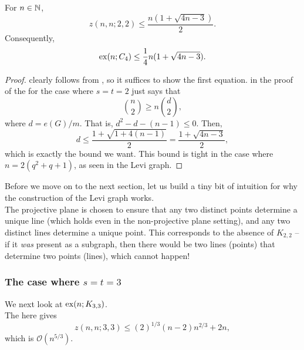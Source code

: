 \documentclass{article}
\begin{document}
		\begin{corollary}
			\label{theo: levi graph optimality}
			For $n\in\mathbb{N}$,
			\begin{equation}
				\label{eqn: z n n 2 2}
				z(n,n;2,2) \le \frac{n (1 + \sqrt{4n-3})}{2}.
			\end{equation}
			Consequently,
			\begin{equation}
				\label{eqn: exx n C4}
				\operatorname{ex}(n;C_4) \le \frac{1}{4} n (1 + \sqrt{4n-3}).
			\end{equation}
		\end{corollary}
		\begin{proof}
			 clearly follows from , so it suffices to show the first equation.  in the proof of the  for the case where $s=t=2$ just says that
			\[ \binom{n}{2} \ge n \binom{d}{2}, \]
			where $d = e(G)/m$. That is, $d^2 - d - (n-1) \le 0$. Then,
			\[ d \le \frac{1 + \sqrt{1 + 4(n-1)}}{2} = \frac{1 + \sqrt{4n-3}}{2}, \]
			which is exactly the bound we want. This bound is tight in the case where $n = 2(q^2+q+1)$, as seen in the Levi graph.
		\end{proof}

		Before we move on to the next section, let us build a tiny bit of intuition for why the construction of the Levi graph works.\\
		The projective plane is chosen to ensure that any two distinct points determine a unique line (which holds even in the non-projective plane setting), and any two distinct lines determine a unique point. This corresponds to the absence of $K_{2,2}$ -- if it \emph{was} present as a subgraph, then there would be two lines (points) that determine two points (lines), which cannot happen!

	\subsubsection{The case where \texorpdfstring{$s=t=3$}{s=t=3}}

		We next look at $\operatorname{ex}(n;K_{3,3})$.\\

		The  here gives
		\[ z(n,n;3,3) \le (2)^{1/3} (n-2)n^{2/3} + 2n, \]
		which is $\mathcal{O}(n^{5/3})$.
\end{document}
